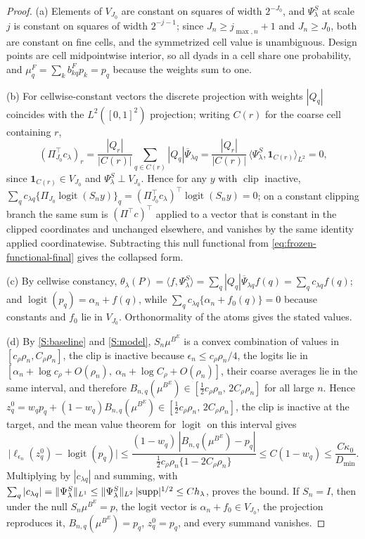 \documentclass[11pt]{article}
\theoremstyle{definition}
\newcommand{\1}{\mathbf 1}\newcommand{\op}{\operatorname}
\begin{document}
\begin{proof}
(a) Elements of $V_{J_0}$ are constant on squares of width $2^{-J_0}$, and
$\Psi_\lambda^S$ at scale $j$ is constant on squares of width $2^{-j-1}$; since
$J_n\ge j_{\max,n}+1$ and $J_n\ge J_0$, both are constant on fine cells, and the
symmetrized cell value is unambiguous.  Design points are cell midpointwise
interior, so all dyads in a cell share one probability, and
$\mu_q^F=\sum_kb^F_{kq}p_k=p_q$ because the weights sum to one.

(b) For cellwise-constant vectors the discrete projection with weights
$|Q_q|$ coincides with the $L^2([0,1]^2)$ projection; writing $C(r)$ for the
coarse cell containing $r$,
\[
(\Pi_{J_0}^\top c_\lambda)_r
=\frac{|Q_r|}{|C(r)|}\sum_{q\in C(r)}|Q_q|\overline\Psi_{\lambda q}
=\frac{|Q_r|}{|C(r)|}\,
\langle\Psi_\lambda^S,\mathbf 1_{C(r)}\rangle_{L^2}=0,
\]
since $\mathbf 1_{C(r)}\in V_{J_0}$ and $\Psi_\lambda^S\perp V_{J_0}$.
Hence for any $y$ with $\operatorname{clip}$ inactive,
$\sum_qc_{\lambda q}\{\Pi_{J_0}\operatorname{logit}(S_ny)\}_q
=(\Pi_{J_0}^\top c_\lambda)^\top\operatorname{logit}(S_ny)=0$; on a constant
clipping branch the same sum is $(\Pi^\top c)^\top$ applied to a vector that is
constant in the clipped coordinates and unchanged elsewhere, and vanishes by the
same identity applied coordinatewise.  Subtracting this null functional from
\eqref{eq:frozen-functional-final} gives the collapsed form.

(c) By cellwise constancy,
$\theta_\lambda(P)=\langle f,\Psi_\lambda^S\rangle
=\sum_q|Q_q|\overline\Psi_{\lambda q}f(q)=\sum_qc_{\lambda q}f(q)$; and
$\operatorname{logit}(p_q)=\alpha_n+f(q)$, while
$\sum_qc_{\lambda q}\{\alpha_n+f_0(q)\}=0$ because constants and $f_0$ lie in
$V_{J_0}$.  Orthonormality of the atoms gives the stated values.

(d) By \ref{S:baseline} and \ref{S:model}, $S_n\mu^{B^E}$ is a convex
combination of values in $[c_\rho\rho_n,C_\rho\rho_n]$, the clip is inactive
because $\epsilon_n\le c_\rho\rho_n/4$, the logits lie in
$[\alpha_n+\log c_\rho+O(\rho_n),\ \alpha_n+\log C_\rho+O(\rho_n)]$, their
coarse averages lie in the same interval, and therefore
$B_{n,q}(\mu^{B^E})\in[\tfrac12c_\rho\rho_n,\,2C_\rho\rho_n]$ for all large
$n$.  Hence
$z_q^0=w_qp_q+(1-w_q)B_{n,q}(\mu^{B^E})\in
[\tfrac12c_\rho\rho_n,\,2C_\rho\rho_n]$, the clip is inactive at the target,
and the mean value theorem for $\operatorname{logit}$ on this interval gives
\[
\bigl|\ell_{\epsilon_n}(z_q^0)-\operatorname{logit}(p_q)\bigr|
\le\frac{(1-w_q)\,|B_{n,q}(\mu^{B^E})-p_q|}{\tfrac12c_\rho\rho_n
\{1-2C_\rho\rho_n\}}
\le C(1-w_q)\le\frac{C\kappa_0}{D_{\min}} .
\]
Multiplying by $|c_{\lambda q}|$ and summing, with
$\sum_q|c_{\lambda q}|=\|\Psi_\lambda^S\|_{L^1}\le
\|\Psi_\lambda^S\|_{L^2}\,|{\rm supp}|^{1/2}\le Ch_\lambda$, proves the bound.
If $S_n=I$, then under the null $S_n\mu^{B^E}=p$, the logit vector is
$\alpha_n+f_0\in V_{J_0}$, the projection reproduces it,
$B_{n,q}(\mu^{B^E})=p_q$, $z_q^0=p_q$, and every summand vanishes.
\end{proof}
\end{document}
